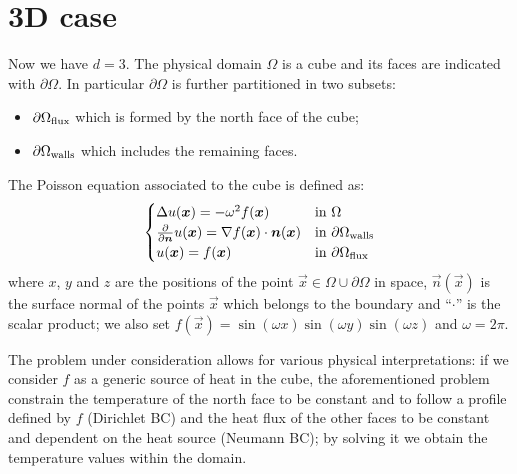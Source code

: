 \section{3D case}

Now we have $d=3$. The physical domain $\Omega$ is a cube and its faces are indicated with $\partial\Omega$. In particular $\partial\Omega$ is further partitioned in two subsets:
\begin{itemize}
	\item $\partial\Omega_\textup{flux}$ which is formed by the north face of the cube;
	\item $\partial\Omega_\textup{walls}$ which includes the remaining faces.
\end{itemize}
The Poisson equation associated to the cube is defined as:
\begin{equation}
	\label{eqn:3D_BV_problem}
	\begin{cases}
		\Delta u(\vec{x}) = - \omega^2 f(\vec{x})  &  \text{in $\Omega$}  \\
		\frac{\partial}{\partial \vec{n}} u(\vec{x}) = \nabla f(\vec{x}) \cdot \vec{n}(\vec{x})  &  \text{in $\partial\Omega_\textup{walls}$}  \\
		u(\vec{x}) = f(\vec{x})  &  \text{in $\partial\Omega_\textup{flux}$}  \\
	\end{cases}
\end{equation}
where $x$, $y$ and $z$ are the positions of the point $\vec{x} \in \Omega\cup\partial\Omega$ in space, $\vec{n}(\vec{x})$ is the surface normal of the points $\vec{x}$ which belongs to the boundary and ``$\cdot$'' is the scalar product; we also set $f(\vec{x}) = \sin(\omega x)\sin(\omega y)\sin(\omega z)$ and $\omega = 2\pi$.


The problem under consideration allows for various physical interpretations: if we consider $f$ as a generic source of heat in the cube, the aforementioned problem constrain the temperature of the north face to be constant and to follow a profile defined by $f$ (Dirichlet BC) and the heat flux of the other faces to be constant and dependent on the heat source (Neumann BC); by solving it we obtain the temperature values within the domain.

